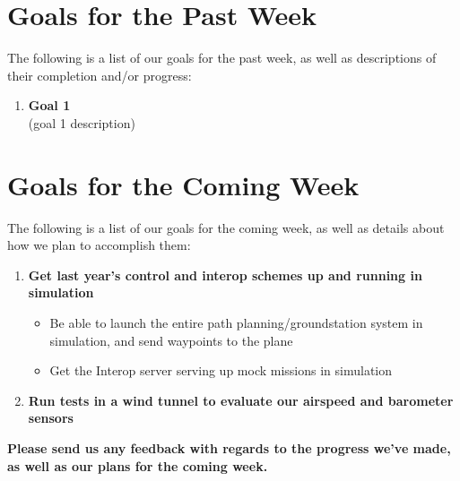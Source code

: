 \documentclass[]{../auvsi_doc}
\begin{document}
\section{Goals for the Past Week}

The following is a list of our goals for the past week, as well as descriptions of their completion and/or progress:

\begin{enumerate}
\item \textbf{Goal 1}\\
(goal 1 description)
\end{enumerate}

\section{Goals for the Coming Week}

The following is a list of our goals for the coming week, as well as details about how we plan to accomplish them:

\begin{enumerate}
\item \textbf{Get last year's control and interop schemes up and running in simulation}\\
\begin{itemize}
	\item Be able to launch the entire path planning/groundstation system in simulation, and send waypoints to the plane
	\item Get the Interop server serving up mock missions in simulation
\end{itemize}
\item \textbf{Run tests in a wind tunnel to evaluate our airspeed and barometer sensors}
\end{enumerate}

\textbf{Please send us any feedback with regards to the progress we've made, as well as our plans for the coming week.}

\newpage
\begin{appendices}



\end{appendices}
\end{document}
